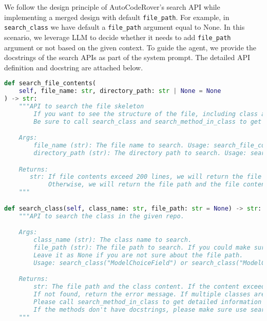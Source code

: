 We follow the design principle of AutoCodeRover's search API while implementing a merged design with default \texttt{file\_path}. For example, in \texttt{search\_class} we have default a \texttt{file\_path} argument equal to None. In this scenario, we leverage LLM to decide whether it needs to add \texttt{file\_path} argument or not based on the given context. 
To guide the agent, we provide the docstrings of the search APIs as part of the system prompt. The detailed API definition and docstring are attached below. 

\begin{lstlisting}[language=Python]
def search_file_contents(
    self, file_name: str, directory_path: str | None = None
) -> str:
    """API to search the file skeleton
        If you want to see the structure of the file, including class and function signatures.
        Be sure to call search_class and search_method_in_class to get the detailed information.

    Args:
        file_name (str): The file name to search. Usage: search_file_contents("example.py"). Do not include the path, only the file name.
        directory_path (str): The directory path to search. Usage: search_file_contents("example.py", "path/to/directory")

    Returns:
       str: If file contents exceed 200 lines, we will return the file skeleton, a string that contains the file path and the file skeleton.
            Otherwise, we will return the file path and the file contents.
    """

def search_class(self, class_name: str, file_path: str = None) -> str:
    """API to search the class in the given repo.

    Args:
        class_name (str): The class name to search.
        file_path (str): The file path to search. If you could make sure the file path, please provide it to avoid ambiguity.
        Leave it as None if you are not sure about the file path.
        Usage: search_class("ModelChoiceField") or search_class("ModelChoiceField", "django/forms/models.py")

    Returns:
        str: The file path and the class content. If the content exceeds 100 lines, we will use class skeleton.
        If not found, return the error message. If multiple classes are found, return the disambiguation message.
        Please call search_method_in_class to get detailed information of the method after skeleton search.
        If the methods don't have docstrings, please make sure use search_method_in_class to get the method signature.
    """


\end{lstlisting}
